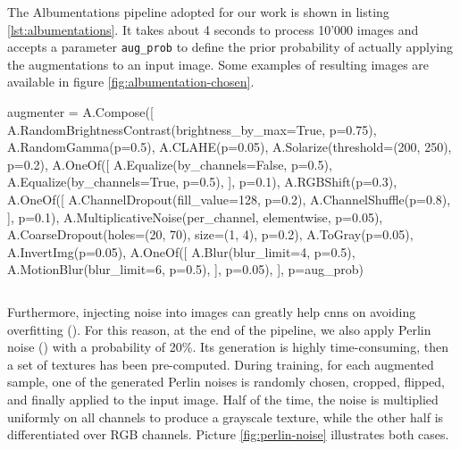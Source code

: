 \medskip

The Albumentations pipeline adopted for our work is shown in listing \ref{lst:albumentations}. It takes about 4 seconds to process 10'000 images and accepts a parameter \texttt{aug\_prob} to define the prior probability of actually applying the augmentations to an input image. Some examples of resulting images are available in figure \ref{fig:albumentation-chosen}.

\vspace{0.1cm}
\begin{python}
augmenter = A.Compose([
	A.RandomBrightnessContrast(brightness_by_max=True, p=0.75),
	A.RandomGamma(p=0.5),
	A.CLAHE(p=0.05),
	A.Solarize(threshold=(200, 250), p=0.2),
	A.OneOf([
		A.Equalize(by_channels=False, p=0.5),
		A.Equalize(by_channels=True, p=0.5),
	], p=0.1),
	A.RGBShift(p=0.3),
	A.OneOf([
		A.ChannelDropout(fill_value=128, p=0.2),
		A.ChannelShuffle(p=0.8),
	], p=0.1),
	A.MultiplicativeNoise(per_channel, elementwise, p=0.05),
	A.CoarseDropout(holes=(20, 70), size=(1, 4), p=0.2),
	A.ToGray(p=0.05),
	A.InvertImg(p=0.05),
	A.OneOf([
		A.Blur(blur_limit=4, p=0.5),
		A.MotionBlur(blur_limit=6, p=0.5),
	], p=0.05),
], p=aug_prob)
\end{python}
\vspace{-0.5cm}
\begin{lstlisting}[frame=none,caption={Chosen Albumentations pipeline}, 
label=lst:albumentations]
\end{lstlisting}

Furthermore, injecting noise into images can greatly help \gls{cnn}s on avoiding overfitting (\cite{shorten2019augmentationsurvey}). For this reason, at the end of the pipeline, we also apply Perlin noise (\cite{perlin-noise}) with a probability of 20\%. Its generation is highly time-consuming, then a set of textures has been pre-computed. During training, for each augmented sample, one of the generated Perlin noises is randomly chosen, cropped, flipped, and finally applied to the input image. Half of the time, the noise is multiplied uniformly on all channels to produce a grayscale texture, while the other half is differentiated over RGB channels. Picture \ref{fig:perlin-noise} illustrates both cases.

